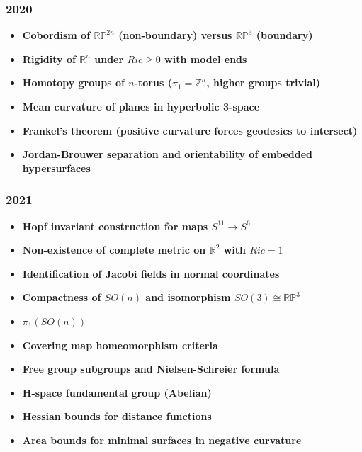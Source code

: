 \subsubsection*{2020}
\begin{itemize}
    \item \textbf{Cobordism of $\mathbb{RP}^{2n}$ (non-boundary) versus $\mathbb{RP}^3$ (boundary)}
    \item \textbf{Rigidity of $\mathbb{R}^n$ under $Ric \geq 0$ with model ends}
    \item \textbf{Homotopy groups of $n$-torus ($\pi_1 = \mathbb{Z}^n$, higher groups trivial)}
    \item \textbf{Mean curvature of planes in hyperbolic 3-space}
    \item \textbf{Frankel's theorem (positive curvature forces geodesics to intersect)}
    \item \textbf{Jordan-Brouwer separation and orientability of embedded hypersurfaces}
\end{itemize}

\subsubsection*{2021}
\begin{itemize}
    \item \textbf{Hopf invariant construction for maps $S^{11} \to S^6$}
    \item \textbf{Non-existence of complete metric on $\mathbb{R}^2$ with $Ric = 1$}
    \item \textbf{Identification of Jacobi fields in normal coordinates}
    \item \textbf{Compactness of $SO(n)$ and isomorphism $SO(3) \cong \mathbb{RP}^3$}
    \item \textbf{$\pi_1(SO(n))$}
    \item \textbf{Covering map homeomorphism criteria}
    \item \textbf{Free group subgroups and Nielsen-Schreier formula}
    \item \textbf{H-space fundamental group (Abelian)}
    \item \textbf{Hessian bounds for distance functions}
    \item \textbf{Area bounds for minimal surfaces in negative curvature}
\end{itemize}

